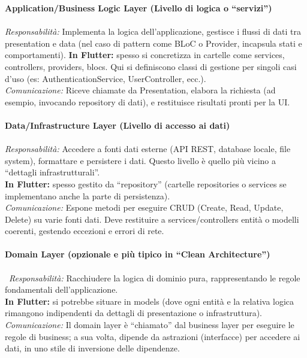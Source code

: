 \documentclass[14pt]{extbook}
\begin{document}
\textbf{Application/Business Logic Layer (Livello di logica o “servizi”)}\\\\
\textit{Responsabilità:} Implementa la logica dell’applicazione, gestisce i flussi di dati tra presentation e data (nel caso di pattern come BLoC o Provider, incapsula stati e comportamenti).
\textbf{In Flutter:} spesso si concretizza in cartelle come services, controllers, providers, blocs. Qui si definiscono classi di gestione per singoli casi d’uso (es: AuthenticationService, UserController, ecc.).\\
\textit{Comunicazione:} Riceve chiamate da Presentation, elabora la richiesta (ad esempio, invocando repository di dati), e restituisce risultati pronti per la UI.\\\\

\textbf{Data/Infrastructure Layer (Livello di accesso ai dati)}\\\\
\textit{Responsabilità:} Accedere a fonti dati esterne (API REST, database locale, file system), formattare e persistere i dati. Questo livello è quello più vicino a “dettagli infrastrutturali”.\\
\textbf{In Flutter:} spesso gestito da “repository” (cartelle repositories o services se implementano anche la parte di persistenza).\\
\textit{Comunicazione:} Espone metodi per eseguire CRUD (Create, Read, Update, Delete) su varie fonti dati. Deve restituire a services/controllers entità o modelli coerenti, gestendo eccezioni e errori di rete.\\\\

\textbf{Domain Layer (opzionale e più tipico in “Clean Architecture”)}\\\\\
\textit{Responsabilità:} Racchiudere la logica di dominio pura, rappresentando le regole fondamentali dell’applicazione.\\
\textbf{In Flutter:} si potrebbe situare in models (dove ogni entità e la relativa logica rimangono indipendenti da dettagli di presentazione o infrastruttura).\\
\textit{Comunicazione:} Il domain layer è “chiamato” dal business layer per eseguire le regole di business; a sua volta, dipende da astrazioni (interfacce) per accedere ai dati, in uno stile di inversione delle dipendenze.\\
\end{document}
